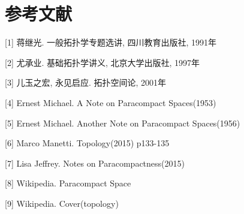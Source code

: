 \chapter*{参考文献}
 


[1] 蒋继光. 一般拓扑学专题选讲, 四川教育出版社, 1991年

[2] 尤承业. 基础拓扑学讲义, 北京大学出版社, 1997年

[3] 儿玉之宏, 永见启应. 拓扑空间论, 2001年

[4] Ernest Michael. A Note on Paracompact Spaces(1953)

[5] Ernest Michael. Another Note on Paracompact Spaces(1956)

[6] Marco Manetti. Topology(2015) p133-135

[7] Lisa Jeffrey. Notes on Paracompactness(2015)

[8] Wikipedia. Paracompact Space

[9] Wikipedia. Cover(topology)

